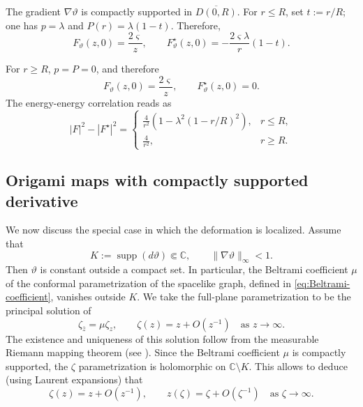 \documentclass[reqno]{amsart}
\numberwithin{equation}{section}
\theoremstyle{definition}
\theoremstyle{remark}
\newcommand\C{\mathbb{C}}
\providecommand{\supp}{\operatorname{supp}}
\begin{document}
The gradient $\nabla\vartheta$ is compactly supported in $\overline{D(0,R)}$. For $r\leq R$, set $t:=r/R$; one has $p=\lambda$ and $P(r)=\lambda(1-t)$. Therefore,
\begin{equation}\label{eq:conical-core-inner-F-Fstar}
        F_\vartheta(z,0)=\frac{2\varsigma}{z},
        \qquad
        F^\star_\vartheta(z,0)=-\frac{2\varsigma\lambda}{r}(1-t).
\end{equation}

For $r\geq R$, $p=P=0$, and therefore
\begin{equation}\label{eq:conical-core-outer-F-Fstar}
        F_\vartheta(z,0)=\frac{2\varsigma}{z},
        \qquad
        F^\star_\vartheta(z,0)=0.
\end{equation}
The energy-energy correlation reads as
\begin{equation}\label{eq:conical-core-energy-scalar}
        |F|^2-|F^\star|^2
        =
        \begin{cases}
        \displaystyle \frac4{r^2}\left(1-\lambda^2(1-r/R)^2\right),& r\leq R,\\[2mm]
        \displaystyle \frac4{r^2},& r\geq R.
        \end{cases}
\end{equation}

\subsection{Origami maps with compactly supported derivative}

We now discuss the special case in which the deformation is localized.  Assume that
\begin{equation}\label{eq:compact-support-assumption}
        K:=\supp(d\vartheta)\Subset\C,
        \qquad
        \|\nabla\vartheta\|_\infty<1.
\end{equation}
Then $\vartheta$ is constant outside a compact set.  In particular, the Beltrami
coefficient $\mu$ of the conformal parametrization of the spacelike graph, defined
in \eqref{eq:Beltrami-coefficient}, vanishes outside $K$.  We take the full-plane
parametrization to be the principal solution of
\begin{equation}\label{eq:principal-parametrization-beltrami}
        \zeta_{\bar z}=\mu\zeta_z,
        \qquad
        \zeta(z)=z+O(z^{-1})
        \quad\text{as }z\to\infty.
\end{equation}
The existence and uniqueness of this solution follow from the measurable Riemann
mapping theorem (see \cite[Chapter~5]{AIM}).  Since the Beltrami coefficient
$\mu$ is compactly supported, the $\zeta$ parametrization is holomorphic on $\C\setminus K$. This allows to deduce (using Laurent expansions) that 
\begin{equation}\label{eq:principal-parametrization}
        \zeta(z)=z+O(z^{-1}),
        \qquad
        z(\zeta)=\zeta+O(\zeta^{-1})
        \quad\text{as }\zeta\to\infty.
\end{equation}
\end{document}
